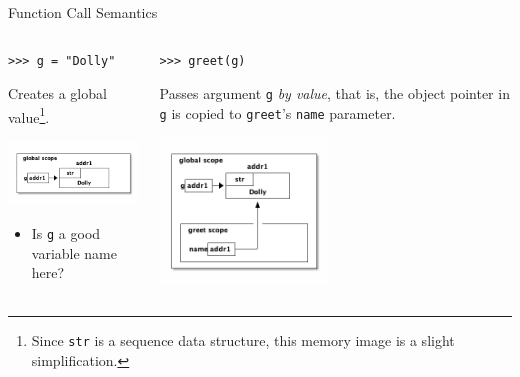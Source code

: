 \documentclass[smaller, aspectratio=1610]{beamer}
\begin{document}
\begin{frame}[label={sec:org1a3f625},fragile]{Function Call Semantics}
 \begin{columns}
\begin{column}{0.3\columnwidth}
\begin{block}{}
\lstset{language=Python,label= ,caption= ,captionpos=b,numbers=none}
\begin{lstlisting}
>>> g = "Dolly"
\end{lstlisting}

Creates a global value\footnote{Since \texttt{str} is a sequence data structure, this memory image is a slight simplification.}.

\begin{center}
\includegraphics[width=1.75in]{diagrams/dolly.png}
\end{center}

\begin{itemize}
\item Is \texttt{g} a good variable name here?
\end{itemize}
\end{block}
\end{column}

\begin{column}{0.3\columnwidth}
\begin{block}{}
\lstset{language=Python,label= ,caption= ,captionpos=b,numbers=none}
\begin{lstlisting}
>>> greet(g)
\end{lstlisting}

Passes argument \texttt{g} \emph{by value}, that is, the object pointer in \texttt{g} is copied to \texttt{greet}'s \texttt{name} parameter.

\begin{center}
\includegraphics[width=1.75in]{diagrams/greet-dolly.png}
\end{center}
\end{block}
\end{column}



\end{columns}
\end{frame}
\end{document}
